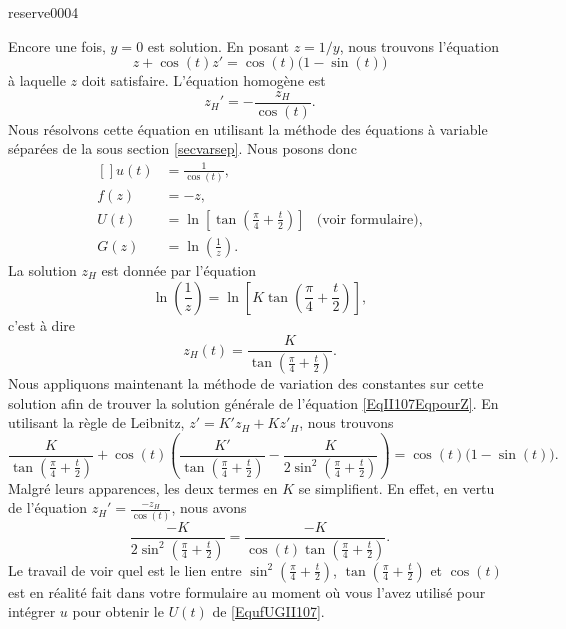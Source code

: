 \begin{corrige}{reserve0004}
\begin{enumerate}
Encore une fois, $y=0$ est solution. En posant $z=1/y$, nous trouvons l'équation
\begin{equation}		\label{EqII107EqpourZ}
	z+\cos(t)z'=\cos(t)\big(1-\sin(t)\big)
\end{equation}
à laquelle $z$ doit satisfaire. L'équation homogène est
\begin{equation}
	z_H'=-\frac{ z_H }{ \cos(t) }.
\end{equation}
Nous résolvons cette équation en utilisant la méthode des équations à variable séparées de la sous section \ref{secvarsep}. Nous posons donc
\begin{equation}		\label{EqufUGII107}
	\begin{aligned}[]
		u(t)	&=\frac{1}{ \cos(t) }, \\
		f(z)	&=-z,\\
		U(t)	&=\ln\left[ \tan\left( \frac{ \pi }{ 4 }+\frac{ t }{ 2 } \right) \right]	&\text{(voir formulaire)},\\
		G(z)	&=\ln\left( \frac{1}{ z } \right).
	\end{aligned}
\end{equation}
La solution $z_H$ est donnée par l'équation
\begin{equation}
	\ln\left( \frac{1}{ z } \right)=\ln\left[ K\tan\left( \frac{ \pi }{ 4 }+\frac{ t }{ 2 } \right) \right],
\end{equation}
c'est à dire
\begin{equation}
	z_H(t)=\frac{ K }{ \tan\left( \frac{ \pi }{ 4 }+\frac{ t }{ 2 } \right) }.
\end{equation}
Nous appliquons maintenant la méthode de variation des constantes sur cette solution afin de trouver la solution générale de l'équation \eqref{EqII107EqpourZ}. En utilisant la règle de Leibnitz, $z'=K'z_H+Kz'_H$, nous trouvons
\begin{equation}
	\frac{ K }{ \tan\left( \frac{ \pi }{ 4 }+\frac{ t }{ 2 } \right) }+\cos(t)\left( \frac{ K' }{  \tan\left( \frac{ \pi }{ 4 }+\frac{ t }{ 2 } \right) }-\frac{ K }{ 2\sin^2 \left( \frac{ \pi }{ 4 }+\frac{ t }{ 2 } \right)  } \right)=\cos(t)\big( 1-\sin(t) \big).
\end{equation}
Malgré leurs apparences, les deux termes en $K$ se simplifient. En effet, en vertu de l'équation $z_H'=\frac{ -z_H }{ \cos(t) }$, nous avons
\begin{equation}
	\frac{ -K }{ 2\sin^2\left( \frac{ \pi }{ 4 }+\frac{ t }{ 2 } \right)}=\frac{ -K }{ \cos(t)\tan\left( \frac{ \pi }{ 4 }+\frac{ t }{ 2 } \right) }.
\end{equation}
Le travail de voir quel est le lien entre $\sin^2\left( \frac{ \pi }{ 4 }+\frac{ t }{ 2 } \right)$, $\tan\left( \frac{ \pi }{ 4 }+\frac{ t }{ 2 } \right)$ et $\cos(t)$ est en réalité fait dans votre formulaire au moment où vous l'avez utilisé pour intégrer $u$ pour obtenir le $U(t)$ de \eqref{EqufUGII107}.


\end{enumerate}
\end{corrige}
